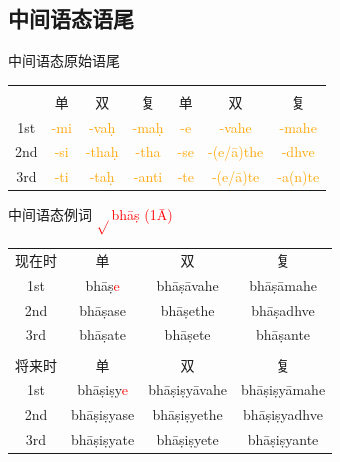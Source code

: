 \documentclass[17pt]{beamer}
\newcommand{\verbroot}[1]{\textcolor{red}{$\sqrt{}$#1}}
\newcommand{\wordending}[1]{\textcolor{Orange}{\nobreakdash-#1}}
\newcommand{\fullpada}[1]{\textcolor{OliveGreen}{#1}}
\newcommand{\veryimportant}[1]{\textcolor{red}{#1}}
\begin{document}
\subsection{中间语态语尾}
\begin{frame}{中间语态原始语尾}
  \small
  \centering
  \begin{NiceTabular}{@{}ccccccc@{}} %
    &  & & &  \\
    & 单 & 双 & 复 & 单 & 双 & 复 \\
    1st & \wordending{mi} & \wordending{vaḥ}  & \wordending{maḥ} & \wordending{e} & \wordending{vahe}  & \wordending{mahe}  \\
    2nd & \wordending{si} & \wordending{thaḥ} & \wordending{tha} & \wordending{se} & \wordending{(e/ā)the} & \wordending{dhve}   \\
    3rd & \wordending{ti} & \wordending{taḥ} & \wordending{anti} & \wordending{te} & \wordending{(e/ā)te} & \wordending{a(n)te}  \\
  \end{NiceTabular}
\end{frame}

\begin{frame}{中间语态例词 \verbroot{bhāṣ (1Ā)}}
  \small
  \centering
  \begin{tabular}{@{}cccc@{}} %
    现在时 & 单 & 双 & 复  \\
    1st & \fullpada{bhāṣ\veryimportant{e}} & \fullpada{bhāṣāvahe}  & \fullpada{bhāṣāmahe}  \\
    2nd & \fullpada{bhāṣase} & \fullpada{bhāṣethe} & \fullpada{bhāṣadhve}   \\
    3rd & \fullpada{bhāṣate} & \fullpada{bhāṣete} & \fullpada{bhāṣante}  \\
    \\
    将来时 & 单 & 双 & 复  \\
    1st & \fullpada{bhāṣiṣy\veryimportant{e}} & \fullpada{bhāṣiṣyāvahe}  & \fullpada{bhāṣiṣyāmahe}  \\
    2nd & \fullpada{bhāṣiṣyase} & \fullpada{bhāṣiṣyethe} & \fullpada{bhāṣiṣyadhve}   \\
    3rd & \fullpada{bhāṣiṣyate} & \fullpada{bhāṣiṣyete} & \fullpada{bhāṣiṣyante}  \\
  \end{tabular}
\end{frame}
\end{document}
